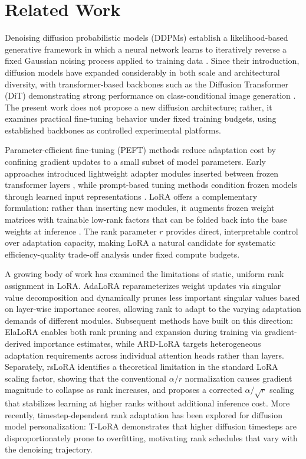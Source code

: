 \section{Related Work}

Denoising diffusion probabilistic models (DDPMs) establish a likelihood-based generative
framework in which a neural network learns to iteratively reverse a fixed Gaussian noising
process applied to training data \cite{ho2020ddpm}. Since their introduction, diffusion models
have expanded considerably in both scale and architectural diversity, with transformer-based
backbones such as the Diffusion Transformer (DiT) demonstrating strong performance on
class-conditional image generation \cite{peebles2023dit}. The present work does not propose a
new diffusion architecture; rather, it examines practical fine-tuning behavior under fixed
training budgets, using established backbones as controlled experimental platforms.

Parameter-efficient fine-tuning (PEFT) methods reduce adaptation cost by confining gradient
updates to a small subset of model parameters. Early approaches introduced lightweight adapter
modules inserted between frozen transformer layers \cite{houlsby2019adapters}, while prompt-based
tuning methods condition frozen models through learned input representations
\cite{lester2021prompt}. LoRA offers a complementary formulation: rather than inserting new
modules, it augments frozen weight matrices with trainable low-rank factors that can be folded
back into the base weights at inference \cite{hu2022lora}. The rank parameter $r$ provides
direct, interpretable control over adaptation capacity, making LoRA a natural candidate for
systematic efficiency-quality trade-off analysis under fixed compute budgets.

A growing body of work has examined the limitations of static, uniform rank assignment in LoRA.
AdaLoRA \cite{zhang2023adalora} reparameterizes weight updates via singular value decomposition
and dynamically prunes less important singular values based on layer-wise importance scores,
allowing rank to adapt to the varying adaptation demands of different modules. Subsequent
methods have built on this direction: ElaLoRA \cite{chang2025elalora} enables both rank pruning
and expansion during training via gradient-derived importance estimates, while ARD-LoRA
\cite{ardlora2025} targets heterogeneous adaptation requirements across individual attention heads
rather than layers. Separately, rsLoRA \cite{kalajdzievski2023rslora} identifies a theoretical
limitation in the standard LoRA scaling factor, showing that the conventional $\alpha/r$
normalization causes gradient magnitude to collapse as rank increases, and proposes a corrected
$\alpha/\sqrt{r}$ scaling that stabilizes learning at higher ranks without additional inference
cost. More recently, timestep-dependent rank adaptation has been explored for diffusion model
personalization: T-LoRA \cite{soboleva2025tlora} demonstrates that higher diffusion timesteps
are disproportionately prone to overfitting, motivating rank schedules that vary with the
denoising trajectory.

